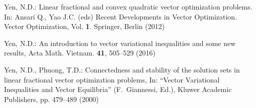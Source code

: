 \documentclass[smallextended,envcountsect]{svjour3}       %
\begin{document}
\begin{thebibliography}{99}
Yen, N.D.: Linear fractional and convex quadratic vector optimization problems. In: Ansari Q., Yao J.C. (eds) Recent Developments in Vector Optimization. Vector Optimization, Vol. \textbf{1}. Springer, Berlin (2012)

 Yen, N.D.: An introduction to vector variational inequalities and some new results, Acta Math. Vietnam. \textbf{41}, 505--529 (2016)

 Yen, N.D., Phuong, T.D.: Connectedness and stability of the solution sets in linear fractional vector optimization problems, In: ``Vector Variational Inequalities and Vector Equilibria'' (F.~Giannessi, Ed.), Kluwer Academic Publishers,  pp. 479--489 (2000)
\end{thebibliography}
\end{document}
